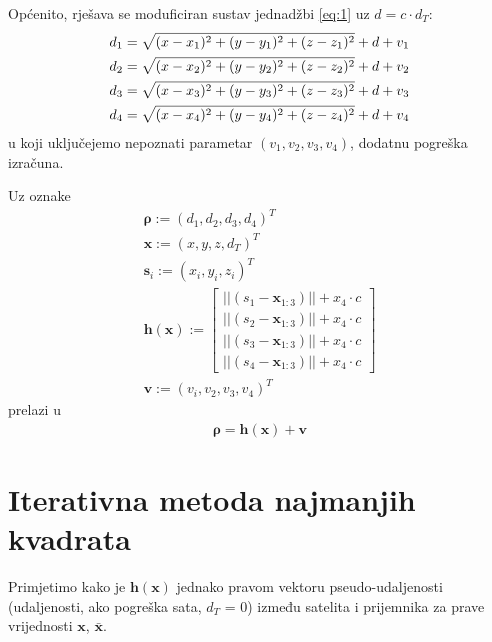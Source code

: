 \documentclass[a4paper,twoside,12pt]{memoir} %
\begin{document}
Općenito, rješava se moduficiran sustav jednadžbi \ref{eq:1} uz $d = c \cdot d_T$:\\
\begin{align}\label{eq:new}
d_1 = \sqrt{(x-x_1)^{2}+(y-y_1)^{2}+(z-z_1)^{2}} +d + v_1\notag \\
d_2 = \sqrt{(x-x_2)^{2}+(y-y_2)^{2}+(z-z_2)^{2}} +d + v_2 \\
d_3 = \sqrt{(x-x_3)^{2}+(y-y_3)^{2}+(z-z_3)^{2}} +d + v_3\notag \\
d_4 = \sqrt{(x-x_4)^{2}+(y-y_4)^{2}+(z-z_4)^{2}} +d + v_4\notag
\end{align}
u koji uključejemo nepoznati parametar $(v_1,v_2,v_3,v_4)$, dodatnu pogreška
izračuna.

Uz oznake 
\begin{align}
\mathbf{\rho} := (d_1, d_2, d_3, d_4)^T \\ 
\mathbf{x} := (x,y,z,d_T)^T \\ 
\mathbf{s}_i := (x_i,y_i,z_i)^T \\ 
\mathbf{h} (\mathbf{x}) := 
\begin{bmatrix}
||(s_1-\mathbf{x}_{1:3})|| + x_4\cdot c\\
||(s_2-\mathbf{x}_{1:3})|| + x_4\cdot c\\
||(s_3-\mathbf{x}_{1:3})|| + x_4\cdot c\\
||(s_4-\mathbf{x}_{1:3})|| + x_4\cdot c
\end{bmatrix} \\
\mathbf{v} := (v_i,v_2,v_3,v_4)^T \label{eq:v}
\end{align}%
prelazi u
\begin{align}\label{eq:matrix}
\mathbf{\rho} = \mathbf{h}(\mathbf{x})+\mathbf{v}
\end{align}%
\section{Iterativna metoda najmanjih kvadrata}

Primjetimo kako je $\mathbf{h}(\mathbf{x})$ jednako pravom vektoru pseudo-udaljenosti (udaljenosti, ako pogreška sata, $d_T$ = 0) između
satelita i prijemnika za prave vrijednosti $\mathbf{x}$, $\bar{\mathbf{x}}$.\\
\end{document}
